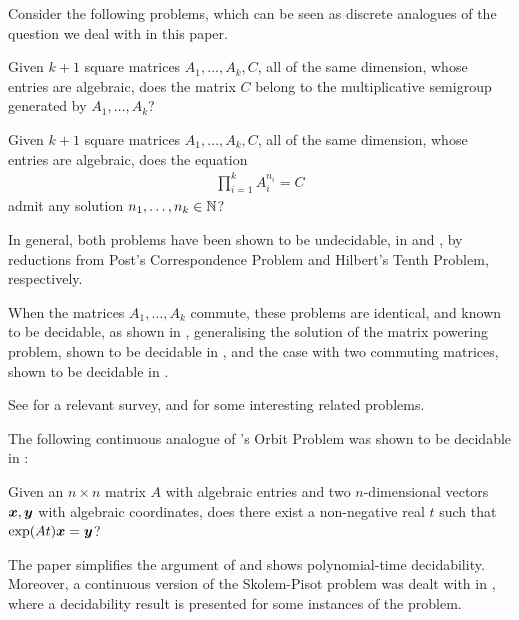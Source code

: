 Consider the following problems, which can be seen as discrete analogues of the question we deal with in this paper.

\begin{definition}
Given $k+1$ square matrices $A_{1}, \ldots, A_{k}, C$, all of the same dimension, whose entries are algebraic, does the matrix $C$ belong to the multiplicative semigroup generated by $A_{1}, \ldots, A_{k}$?
\end{definition}

\begin{definition}
Given $k+1$ square matrices $A_{1}, \ldots, A_{k}, C$, all of the same dimension, whose entries are algebraic, does the equation
\begin{align*}
\prod\limits_{i=1}^{k} A_{i}^{n_{i}} = C
\end{align*}
admit any solution $n_{1}, \ldots, n_{k} \in \mathbb{N}$?
\end{definition}

In general, both problems have been shown to be undecidable, in
\cite{Paterson} and \cite{MEHTP}, by reductions from Post's
Correspondence Problem and Hilbert's Tenth Problem, respectively.

When the matrices $A_{1}, \ldots, A_{k}$ commute, these problems are
identical, and known to be decidable, as shown in
\cite{MultiplicativeMatrixEquations}, generalising the solution of the
matrix powering problem, shown to be decidable in \cite{KL}, and the
case with two commuting matrices, shown to be decidable in \cite{ABC}.

See \cite{HalavaSurvey} for a relevant survey, and \cite{CK05} for
some interesting related problems.

The following continuous analogue of \cite{KL}'s Orbit Problem was
shown to be decidable in \cite{Hainry}:

\begin{definition}
Given an $n \times n$ matrix $A$ with algebraic entries and two
$n$-dimensional vectors $\boldsymbol{x}, \boldsymbol{y}$ with
algebraic coordinates, does there exist a non-negative real $t$ such
that $\exp(At) \boldsymbol{x} = \boldsymbol{y}$?
\end{definition}

The paper \cite{ContinuousOrbitIPL} simplifies the argument of
\cite{Hainry} and shows polynomial-time decidability. Moreover, a
continuous version of the Skolem-Pisot problem was dealt with in
\cite{ContinuousSkolem}, where a decidability result is presented for
some instances of the problem.

